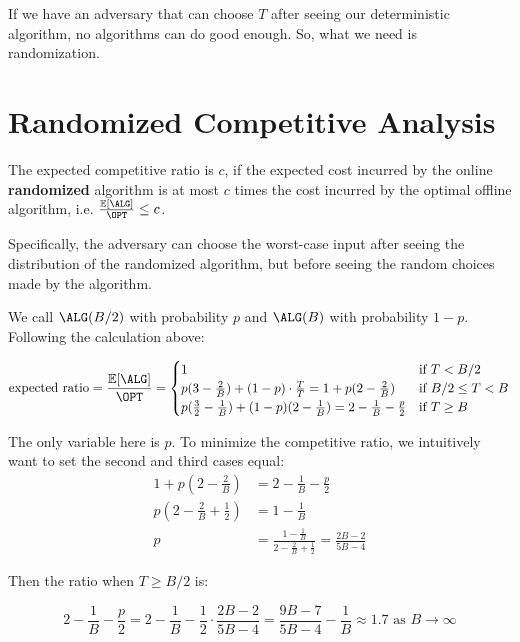 If we have an adversary that can choose $T$ after seeing our deterministic algorithm, no algorithms can do good enough. So, what we need is randomization.

\section{Randomized Competitive Analysis}

\begin{definition}
	The expected competitive ratio is $c$, if the expected cost incurred by the online \textbf{randomized} algorithm is at most $c$ times the cost incurred by the optimal offline algorithm, i.e. $\frac{\mathbb{E}[\ALG]}{\OPT} \leq c$.

	Specifically, the adversary can choose the worst-case input after seeing the distribution of the randomized algorithm, but before seeing the random choices made by the algorithm.
\end{definition}

\begin{eg}
	We call $\ALG(B/2)$ with probability $p$ and $\ALG(B)$ with probability $1-p$. Following the calculation above:

	\[ \text{expected ratio} = \frac{\mathbb{E}[\ALG]}{\OPT} = \begin{cases}
			1                                                                                     & \text{if } T < B/2        \\
			p(3 - \frac{2}{B}) + (1-p) \cdot \frac{T}{T} = 1 + p(2 - \frac{2}{B})                 & \text{if } B/2 \leq T < B \\
			p(\frac{3}{2} - \frac{1}{B}) + (1-p)(2 - \frac{1}{B}) = 2 - \frac{1}{B} - \frac{p}{2} & \text{if } T \geq B
		\end{cases} \]

	The only variable here is $p$. To minimize the competitive ratio, we intuitively want to set the second and third cases equal:
	\begin{align*}
		1 + p(2 - \frac{2}{B})           & = 2 - \frac{1}{B} - \frac{p}{2}                                                  \\
		p(2 - \frac{2}{B} + \frac{1}{2}) & = 1 - \frac{1}{B}                                                                \\
		p                                & = \frac{1 - \frac{1}{B}}{2 - \frac{2}{B} + \frac{1}{2}} = \frac{2B - 2}{5 B - 4}
	\end{align*}

	Then the ratio when $T \geq B/2$ is:

	\[
		2 - \frac{1}{B} - \frac{p}{2} = 2 - \frac{1}{B} - \frac{1}{2} \cdot \frac{2B - 2}{5 B - 4} = \frac{9B-7}{5B-4} - \frac{1}{B} \approx 1.7 \text{ as } B \rightarrow \infty
	\]
\end{eg}

